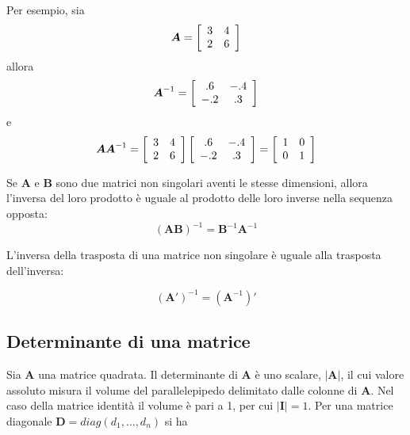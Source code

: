 Per esempio, sia
\begin{displaymath}
\boldsymbol{A} =  \left[ \begin{array}{c c}
3 & 4 \\
2 & 6
\end{array}
 \right]
\end{displaymath}
allora
\begin{displaymath}
\boldsymbol{A}^{-1} =  \left[ \begin{array}{c c}
.6 & -.4 \\
-.2 & .3
\end{array}
 \right]
\end{displaymath}
e
\begin{displaymath}
\boldsymbol{A}\boldsymbol{A}^{-1} =\left[ \begin{array}{c c}
3 & 4 \\
2 & 6
\end{array}
 \right]
\left[ \begin{array}{c c}
.6 & -.4 \\
-.2 & .3
\end{array}
 \right] =
 \left[ \begin{array}{c c}
1 & 0 \\
0 & 1
\end{array}
 \right]
\end{displaymath}

Se $\boldsymbol{A}$ e $\boldsymbol{B}$ sono due  matrici non
singolari aventi le stesse dimensioni, allora l'inversa del loro
prodotto {\`e} uguale al prodotto delle loro inverse nella
sequenza opposta:
$$(\boldsymbol{AB})^{-1}=\boldsymbol{B}^{-1}\boldsymbol{A}^{-1}$$

L'inversa della trasposta di una matrice non singolare
{\`e} uguale alla trasposta dell'inversa:

    $$(\boldsymbol{A}')^{-1}=(\boldsymbol{A}^{-1})'$$

\subsection{Determinante di una matrice}

 Sia $\boldsymbol{A}$ una matrice quadrata.
Il determinante di $\boldsymbol{A}$ {\`e} uno scalare, $|\boldsymbol{A}|$, il cui
valore assoluto misura il volume del parallelepipedo delimitato
dalle colonne di $\boldsymbol{A}$.
 Nel caso della matrice identit{\`a} il volume {\`e} pari a 1, per
cui $|\boldsymbol{I}| =1$.
 Per una matrice diagonale $\boldsymbol{D} = diag(d_1, \dots,
d_n)$ si ha

